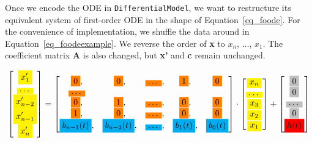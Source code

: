 Once we encode the ODE in \verb|DifferentialModel|, we want to restructure its equivalent system of first-order ODE in the shape of Equation~\ref{eq_foode}. For the convenience of implementation, we shuffle the data around in Equation~\ref{eq_foodeexample}. We reverse the order of \textbf{x} to $x_{n}$, $\dots$, $x_{1}$. The coefficient matrix \textbf{A} is also changed, but \textbf{x'} and \textbf{c} remain unchanged.

\begin{equation} \label{eq_foodeexamplecolor}
	\begin{bmatrix}
		\highlight{yellow}{x_{1}'} \\
    \highlight{yellow}{\dots} \\
    \highlight{yellow}{x_{n-2}'} \\
    \highlight{yellow}{x_{n-1}'} \\
    \highlight{yellow}{x_{n}'}
	\end{bmatrix}
    = 
  \begin{bmatrix}
		\highlight{orange}{0}, & \highlight{orange}{0}, & \highlight{orange}{\dots}, & \highlight{orange}{1}, & \highlight{orange}{0} \\
    \highlight{orange}{\dots} \\
    \highlight{orange}{0}, & \highlight{orange}{1}, & \highlight{orange}{\dots}, & \highlight{orange}{0}, & \highlight{orange}{0} \\
    \highlight{orange}{1}, & \highlight{orange}{0}, & \highlight{orange}{\dots}, & \highlight{orange}{0}, & \highlight{orange}{0} \\
    \highlight{cyan}{b_{n-1}(t)}, & \highlight{cyan}{b_{n-2}(t)}, & \highlight{cyan}{\dots}, & \highlight{cyan}{b_{1}(t)}, & \highlight{cyan}{b_{0}(t)}
	\end{bmatrix}
    \cdot
  \begin{bmatrix}
    \highlight{yellow}{x_{n}} \\
    \highlight{yellow}{\dots} \\
    \highlight{yellow}{x_{3}} \\
		\highlight{yellow}{x_{2}} \\
    \highlight{yellow}{x_{1}}
	\end{bmatrix}
    + 
  \begin{bmatrix}
    \highlight{lightgray}{0} \\
    \highlight{lightgray}{0} \\
    \highlight{lightgray}{\dots} \\
    \highlight{lightgray}{0} \\
    \highlight{red}{h(t)}
	\end{bmatrix}
\end{equation}

